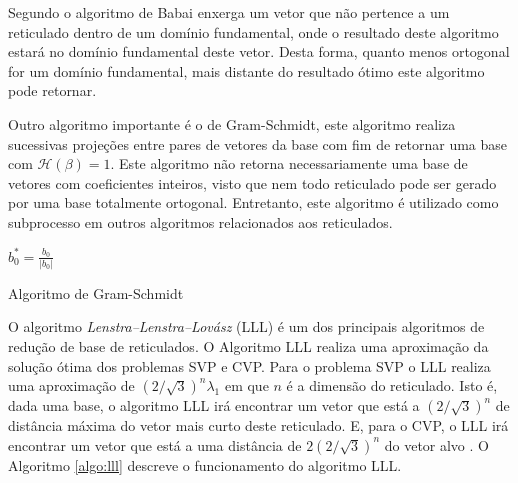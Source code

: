         Segundo \cite{barros} o algoritmo de Babai enxerga um vetor que não pertence a um reticulado dentro de um domínio fundamental, onde o resultado deste algoritmo estará no domínio fundamental deste vetor. Desta forma, quanto menos ortogonal for um domínio fundamental, mais distante do resultado ótimo este algoritmo pode retornar.

        Outro algoritmo importante é o de Gram-Schmidt, este algoritmo realiza sucessivas projeções entre pares de vetores da base com fim de retornar uma base com $\mathcal{H}(\beta) = 1$. Este algoritmo não retorna necessariamente uma base de vetores com coeficientes inteiros, visto que nem todo reticulado pode ser gerado por uma base totalmente ortogonal. Entretanto, este algoritmo é utilizado como subprocesso em outros algoritmos relacionados aos reticulados.

        \begin{algorithm}[!htbp]
            \SetAlgoLined
            $b_0^{*} = \frac{b_0}{|b_0|}$\\
            
        
            \caption{Algoritmo de Gram-Schmidt}
            \label{algo:gram_schmidt}
        \end{algorithm}
    
        O algoritmo \textit{Lenstra–Lenstra–Lovász} (LLL) \cite{lll} é um dos principais algoritmos de redução de base de reticulados. O Algoritmo LLL realiza uma aproximação da solução ótima dos problemas \ac{SVP} e \ac{CVP}. Para o problema \ac{SVP} o LLL realiza uma aproximação de $(2/\sqrt{3})^n \lambda_1$ em que $n$ é a dimensão do reticulado. Isto é, dada uma base, o algoritmo LLL irá encontrar um vetor que está a $(2/\sqrt{3})^n$ de distância máxima do vetor mais curto deste reticulado. E, para o \ac{CVP}, o LLL irá encontrar um vetor que está a uma distância de $2(2/\sqrt{3})^n$ do vetor alvo \cite{daniele-lattices}. O Algoritmo \ref{algo:lll} descreve o funcionamento do algoritmo LLL.\\    

